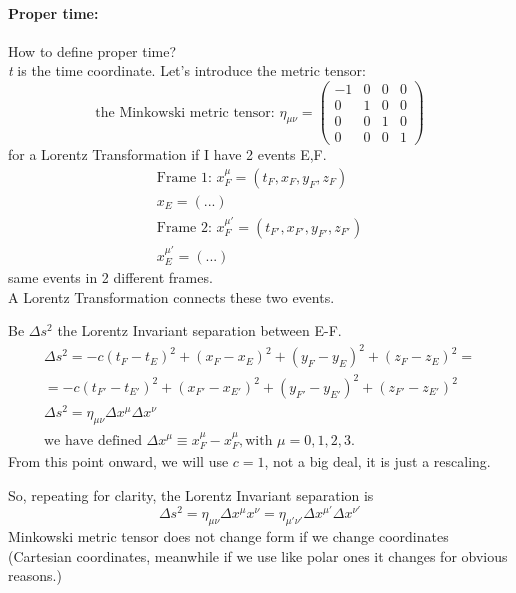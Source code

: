 \paragraph{Proper time:} How to define proper time? \\
\emph{t} is the time coordinate. Let's introduce the metric tensor:
\begin{equation}
	\text{the Minkowski metric tensor: } \eta_{\mu \nu } = \begin{pmatrix}
	-1 & 0 & 0 & 0 \\
	0 & 1 & 0 & 0 \\
	0 & 0 & 1 & 0 \\
	0 & 0 & 0 & 1
	\end{pmatrix} 		
\end{equation}
for a Lorentz Transformation if I have 2 events E,F.
\begin{gather*}
	\text{Frame 1: } x_{F}^{\mu } = \left( t_{F}, x_{F}, y_{F}, z_{F} \right)\\
	x_{E} = \left( ... \right) \\
	\text{Frame 2: } x_{F}^{\mu' } = \left( t_{F'}, x_{F'}, y_{F'}, z_{F'} \right) \\
	x_{E}^{\mu' } = \left( ... \right)	 
\end{gather*}
same events in 2 different frames. \\
A Lorentz Transformation connects these two events.

Be $\Delta s^{2}$ the Lorentz Invariant separation between E-F.
\begin{gather*}
\Delta s^{2} = -c \left( t_{F}-t_{E} \right)^{2} + \left( x_{F}- x_{E} \right)^{2} + \left( y_{F}-y_{E} \right)^{2} + \left( z_{F}-z_{E} \right)^{2} =\\
= -c (t_{F'}-t_{E'})^{2}  + (x_{F'}- x_{E'})^{2}  + (y_{F'}-y_{E'})^{2}  + (z_{F'}-z_{E'})^{2} \\
\Delta s^{2} = \eta_{\mu \nu } \Delta x^{\mu } \Delta x^{\nu } \\
\text{we have defined } \Delta x^{\mu } \equiv x_{F}^{\mu} - x_{F}^{\mu }, \text{with } \mu = 0,1,2,3.
\end{gather*}
From this point onward, we will use $c=1$, not a big deal, it is just a rescaling.\par

So, repeating for clarity, the Lorentz Invariant separation is
\begin{equation}
\Delta s^{2} = \eta_{\mu  \nu } \Delta x^{\mu } x^{\nu } = \eta_{\mu'\nu'} \Delta x^{\mu '} \Delta x^{\nu'}
\end{equation}
Minkowski metric tensor does not change form if we change coordinates (Cartesian coordinates, meanwhile if we use like polar ones it changes for obvious reasons.) \par

